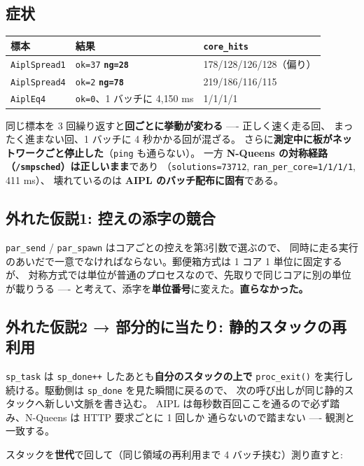 \documentclass[a4paper,11pt]{ltjsarticle}
\begin{document}
\subsection{症状}
\begin{center}
\begin{tabular}{lll}
\toprule
標本 & 結果 & \texttt{core\_hits} \\
\midrule
\texttt{AiplSpread1} & \texttt{ok=37} \textbf{\texttt{ng=28}} & 178/128/126/128（偏り）\\
\texttt{AiplSpread4} & \texttt{ok=2} \textbf{\texttt{ng=78}} & 219/186/116/115 \\
\texttt{AiplEq4} & \texttt{ok=0}、1 バッチに 4{,}150 ms & 1/1/1/1 \\
\bottomrule
\end{tabular}
\end{center}

同じ標本を 3 回繰り返すと\textbf{回ごとに挙動が変わる} ---- 正しく速く走る回、
まったく進まない回、1 バッチに 4 秒かかる回が混ざる。
さらに\textbf{測定中に板がネットワークごと停止した}（\texttt{ping} も通らない）。
一方 \textbf{N-Queens の対称経路（\texttt{/smpsched}）は正しいまま}であり
（\texttt{solutions=73712}, \texttt{ran\_per\_core=1/1/1/1}, 411 ms）、
壊れているのは \textbf{AIPL のバッチ配布に固有}である。

\subsection{外れた仮説1: 控えの添字の競合}
\texttt{par\_send} / \texttt{par\_spawn} はコアごとの控えを第3引数で選ぶので、
同時に走る実行のあいだで一意でなければならない。郵便箱方式は 1 コア 1 単位に固定するが、
対称方式では単位が普通のプロセスなので、先取りで同じコアに別の単位が載りうる ----
と考えて、添字を\textbf{単位番号}に変えた。\textbf{直らなかった。}

\subsection{外れた仮説2 → 部分的に当たり: 静的スタックの再利用}
\texttt{sp\_task} は \texttt{sp\_done++} したあとも\textbf{自分のスタックの上で}
\texttt{proc\_exit()} を実行し続ける。駆動側は \texttt{sp\_done} を見た瞬間に戻るので、
次の呼び出しが同じ静的スタックへ新しい文脈を書き込む。
AIPL は毎秒数百回ここを通るので必ず踏み、N-Queens は HTTP 要求ごとに 1 回しか
通らないので踏まない ---- 観測と一致する。

スタックを\textbf{世代}で回して（同じ領域の再利用まで 4 バッチ挟む）測り直すと:
\end{document}
